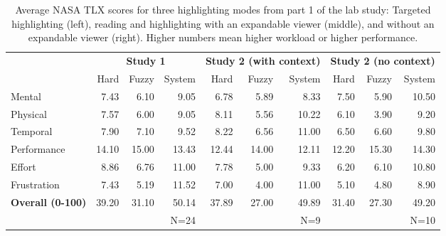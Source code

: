 

\begin{table}
    \footnotesize
    \centering

    \begin{tabular}{l r r r | r r r | r r r }
    
     & \multicolumn{3}{c|}{\textbf{Study 1}}
     & \multicolumn{3}{c|}{\textbf{Study 2 (with context)}}
     & \multicolumn{3}{c}{\textbf{Study 2 (no context)}} \\
    
     & Hard & Fuzzy & System
     & Hard & Fuzzy & System
     & Hard & Fuzzy & System \\
    \hline
    Mental 
    & 7.43 & 6.10 & 9.05
    & 6.78 & 5.89 & 8.33
    & 7.50 & 5.90 & 10.50 \\
    Physical
    & 7.57 & 6.00 & 9.05
    & 8.11 & 5.56 & 10.22
    & 6.10 & 3.90 & 9.20 \\
    Temporal
    & 7.90 & 7.10 & 9.52
    & 8.22 & 6.56 & 11.00
    & 6.50 & 6.60 & 9.80 \\
    Performance
    & 14.10 & 15.00 & 13.43
    & 12.44 & 14.00 & 12.11
    & 12.20 & 15.30 & 14.30 \\
    Effort
    & 8.86 & 6.76 & 11.00
    & 7.78 & 5.00 & 9.33
    & 6.20 & 6.10 & 10.80 \\
    Frustration
    & 7.43 & 5.19  & 11.52
    & 7.00 & 4.00 & 11.00
    & 5.10 & 4.80 & 8.90 \\
    \hline
    \textbf{Overall (0-100)}
    & 39.20 &31.10 & 50.14
    & 37.89 & 27.00 & 49.89
    & 31.40 & 27.30 & 49.20 \\
    
    
    & & & N=24
    & & & N=9
    & & & N=10 \\
    \end{tabular}
    
    \caption[NASA TLX scores for three highlighting modes.]{Average NASA TLX scores for three highlighting modes from part 1 of the lab study: Targeted highlighting (left), reading and highlighting with an expandable viewer (middle), and without an expandable viewer (right). Higher numbers mean higher workload or higher performance.}
    \label{tab:nasa_train}
\end{table}



